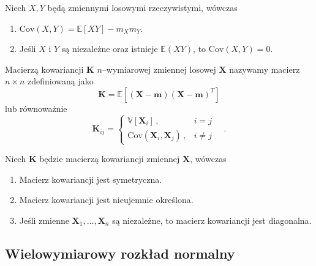 \documentclass{myclass}
\numberwithin{equation}{section}
\begin{document}
\begin{theorem}
Niech \(X, Y\) będą zmiennymi losowymi rzeczywistymi, wówczas

\begin{enumerate}

    \item \(\mathrm{Cov}(X, Y) = \mathbb{E}[XY] - m_X m_Y\).
    
    \item Jeśli \(X\) i \(Y\) są niezależne oraz istnieje \(\mathbb{E}(XY)\), to \(\mathrm{Cov}(X,Y)
    = 0\).
\end{enumerate}
\end{theorem}

\begin{definition}\label{def:covmat}
Macierzą kowariancji \(\mathbf{K}\) \(n\)--wymiarowej zmiennej losowej \(\mathbf{X}\) nazywamy
macierz \(n \times n\) zdefiniowaną jako
\begin{equation*}
    \mathbf{K} = \mathbb{E}[(\mathbf{X} - \mathbf{m})(\mathbf{X} - \mathbf{m})^T]
\end{equation*}
lub równoważnie
\begin{equation*}
    \mathbf{K}_{ij} = \begin{cases}
        \mathbb{V}[\mathbf{X}_i]\,,&i=j\\
        \mathrm{Cov}(\mathbf{X}_i, \mathbf{X}_j)\,,&i\neq j
    \end{cases}\quad.
\end{equation*}
\end{definition}

\begin{theorem}\label{th:covmat}
Niech \(\mathbf{K}\) będzie macierzą kowariancji zmiennej \(\mathbf{X}\), wówczas
\begin{enumerate}

    \item Macierz kowariancji jest symetryczna.

    \item Macierz kowariancji jest nieujemnie określona.

    \item Jeśli zmienne \(\mathbf{X}_1,\ldots,\mathbf{X}_n\) są niezależne, to macierz kowariancji
    jest diagonalna.
    
\end{enumerate}
\end{theorem}


\subsection{Wielowymiarowy rozkład normalny}
\end{document}
